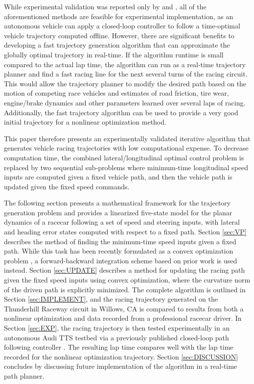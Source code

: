 \documentclass[twocolumn,10pt]{asme2ej}
\begin{document}
 While experimental validation was reported only by \cite{theodosis} and \cite{gerdts}, all of the aforementioned methods are 
 feasible for experimental implementation, as an autonomous vehicle can apply a closed-loop controller to follow a time-optimal vehicle trajectory computed offline. 
 However, there are  significant benefits to developing a fast trajectory generation algorithm that can approximate the globally optimal trajectory in real-time. 
 If the algorithm runtime is small compared to the actual lap time, the algorithm can run as a real-time trajectory planner and find a fast racing line 
 for the next several turns of the racing circuit. This would allow the trajectory planner to modify the desired path based on the motion of competing race vehicles and 
 estimates of road friction, tire wear, engine/brake dynamics and other parameters learned over several laps of racing. Additionally, the fast trajectory algorithm can
 be used to provide a very good initial trajectory for a nonlinear optimization method.  
  
 This paper therefore presents an experimentally validated iterative algorithm that generates vehicle racing trajectories with low computational expense. 
 To decrease computation time, the combined lateral/longitudinal optimal control problem is replaced by two sequential sub-problems 
 where minimum-time longitudinal speed inputs are computed given a fixed vehicle path, and then the vehicle path is updated given the fixed speed commands. 
 
 The following section presents a mathematical framework for the trajectory generation
 problem and provides a linearized five-state model for the planar dynamics of a racecar following a set of speed and steering inputs, with lateral and heading error states computed with respect to a fixed path.
 Section \ref{sec:VP} describes the method of finding the minimum-time speed inputs given a fixed path.  While this task has been recently formulated as a convex optimization problem \cite{lipp}, a forward-backward
 integration scheme based on prior work \cite{subosits} is used instead.  Section \ref{sec:UPDATE} describes a method for updating the racing path given the fixed speed inputs using convex optimization, where the curvature norm
 of the driven path is explicitly minimized. The complete algorithm is outlined in Section \ref{sec:IMPLEMENT}, and the racing trajectory generated on the Thunderhill Raceway circuit
 in Willows, CA is compared to results from both a nonlinear optimization and data recorded from a professional racecar driver. In Section \ref{sec:EXP}, the racing trajectory is then tested experimentally in
 an autonomous Audi TTS testbed via a previously published closed-loop path following controller \cite{kapaniaVSD}. The resulting lap time compares well with the lap time
 recorded for the nonlinear optimization trajectory. Section \ref{sec:DISCUSSION} concludes by discussing 
 future implementation of the algorithm in a real-time path planner.  
\end{document}
